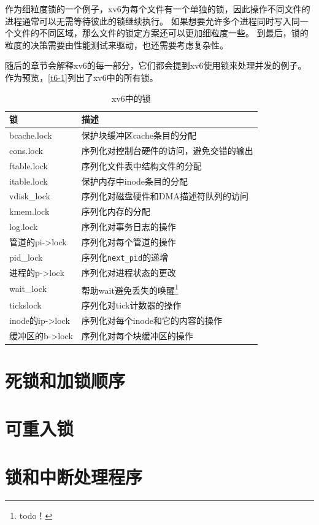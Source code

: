 作为细粒度锁的一个例子，xv6为每个文件有一个单独的锁，因此操作不同文件的进程通常可以无需等待彼此的锁继续执行。
如果想要允许多个进程同时写入同一个文件的不同区域，那么文件的锁定方案还可以更加细粒度一些。
到最后，锁的粒度的决策需要由性能测试来驱动，也还需要考虑复杂性。

随后的章节会解释xv6的每一部分，它们都会提到xv6使用锁来处理并发的例子。
作为预览，\autoref{t6-1}列出了xv6中的所有锁。

\begin{table}[htbp]
    \centering
    \begin{tabular}{l|l}
        \textbf{锁}     & \textbf{描述} \\
        \hline
        bcache.lock     & 保护块缓冲区cache条目的分配   \\
        cons.lock       & 序列化对控制台硬件的访问，避免交错的输出  \\
        ftable.lock     & 序列化文件表中结构文件的分配  \\
        itable.lock     & 保护内存中inode条目的分配     \\
        vdisk\_lock     & 序列化对磁盘硬件和DMA描述符队列的访问     \\
        kmem.lock       & 序列化内存的分配      \\
        log.lock        & 序列化对事务日志的操作    \\
        管道的pi->lock   & 序列化对每个管道的操作    \\
        pid\_lock       & 序列化\texttt{next\_pid}的递增    \\
        进程的p->lock    & 序列化对进程状态的更改   \\
        wait\_lock      & 帮助wait避免丢失的唤醒\footnote{todo！}    \\
        tickslock       & 序列化对tick计数器的操作  \\
        inode的ip->lock & 序列化对每个inode和它的内容的操作 \\
        缓冲区的b->lock  & 序列化对每个块缓冲区的操作   \\
    \end{tabular}
    \caption{xv6中的锁}
    \label{t6-1}
\end{table}

\section{死锁和加锁顺序}

\section{可重入锁}

\section{锁和中断处理程序}\label{s6-6}
